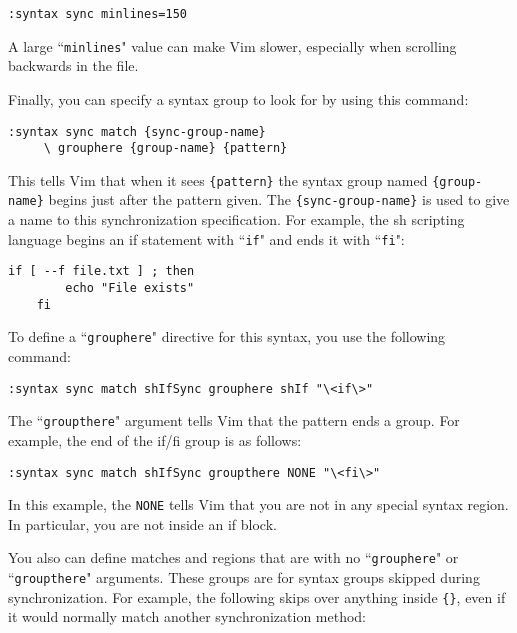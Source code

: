 \begin{Verbatim}[samepage=true]
 :syntax sync minlines=150
\end{Verbatim}

A large ``\texttt{minlines}" value can make Vim slower, especially when scrolling backwards in the file.

Finally, you can specify a syntax group to look for by using this command:

\begin{Verbatim}[samepage=true]
 :syntax sync match {sync-group-name}
     \ grouphere {group-name} {pattern}
\end{Verbatim}

This tells Vim that when it sees \texttt{\{pattern\}} the syntax group named \texttt{\{group-name\}} begins just after the pattern given.
The \texttt{\{sync-group-name\}} is used to give a name to this synchronization specification.
For example, the sh scripting language begins an if statement with ``\texttt{if}" and ends it with ``\texttt{fi}":

\begin{Verbatim}[samepage=true]
    if [ --f file.txt ] ; then 
        echo "File exists" 
    fi 
\end{Verbatim}

To define a ``\texttt{grouphere}" directive for this syntax, you use the following command:

\begin{Verbatim}[samepage=true]
 :syntax sync match shIfSync grouphere shIf "\<if\>"
\end{Verbatim}

The ``\texttt{groupthere}" argument tells Vim that the pattern ends a group.
For example, the end of the if/fi group is as follows:

\begin{Verbatim}[samepage=true]
 :syntax sync match shIfSync groupthere NONE "\<fi\>"
\end{Verbatim}

In this example, the \texttt{NONE} tells Vim that you are not in any special syntax region.
In particular, you are not inside an if block.

You also can define matches and regions that are with no ``\texttt{grouphere}" or ``\texttt{groupthere}" arguments.
These groups are for syntax groups skipped during synchronization.
For example, the following skips over anything inside \texttt{\{\}}, even if it would normally match another synchronization method:

